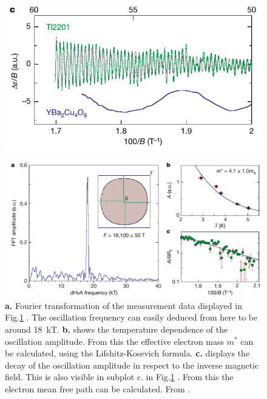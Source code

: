 \documentclass[10pt]{report}
\numberwithin{equation}{chapter}
\newcommand{\myRef}[1]{
  Fig.\ref{#1}
}
\begin{document}
\begin{figure}[t]
\begin{minipage}[c][6.00cm]{.60\textwidth}
    \includegraphics[width=1.0\linewidth]{../img/QO_measurement_c.png}
    \captionsetup{width=.95\linewidth}
  \end{minipage}
  \label{fig:QO_measurement}
\end{figure}

\vspace{6.0cm}
\begin{figure}
  \centering
  \includegraphics[width=1.0\textwidth]{../img/QO_measurement_FFT.png}
  \caption{\textbf{a.} Fourier transformation of the measurement data displayed in \myRef{fig:QO_measurement}. The oscillation frequency can easily deduced from here to be around \SI[mode=text]{18}{kT}. \textbf{b.} shows the temperature dependence of the oscillation amplitude. From this the effective electron mass $m^*$ can be calculated, using the Lifshitz-Kosevich formula. \textbf{c.} displays the decay of the oscillation amplitude in respect to the inverse magnetic field. This is also visible in subplot c. in \myRef{fig:QO_measurement}. From this the electron mean free path can be calculated. From \cite{Vignolle2008}.}
  \label{fig:QO_measurement_FFT}
\end{figure}
\end{document}
